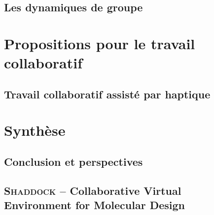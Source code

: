 \documentclass[myfrancais]{mythesis}
\begin{document}
	\chapter{Les dynamiques de groupe}
	\part{Propositions pour le travail collaboratif}
	\chapter{Travail collaboratif assisté par haptique}
	\part{Synthèse}
	\chapter{Conclusion et perspectives}

	\myglossary
	\appendix
	\chapter{\textsc{Shaddock} -- Collaborative Virtual Environment for Molecular Design}
\end{document}
